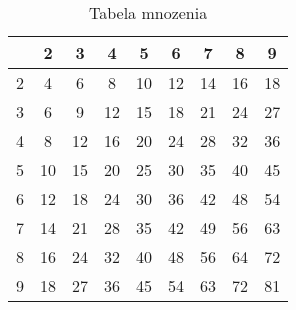 \begin{table}[htbp]
\centering
\begin{tabular}{|c||c|c|c|c|c|c|c|c|} \hline
  &  2  &  3  &  4  &  5  &  6  &  7  &  8  &  9  \\ \hline\hline
2 &  4  &  6  &  8  &  10 &  12 &  14 &  16 &  18 \\ \hline
3 &  6  &  9  &  12 &  15 &  18 &  21 &  24 &  27 \\ \hline
4 &  8  &  12 &  16 &  20 &  24 &  28 &  32 &  36 \\ \hline
5 &  10 &  15 &  20 &  25 &  30 &  35 &  40 &  45 \\ \hline
6 &  12 &  18 &  24 &  30 &  36 &  42 &  48 &  54 \\ \hline
7 &  14 &  21 &  28 &  35 &  42 &  49 &  56 &  63 \\ \hline
8 &  16 &  24 &  32 &  40 &  48 &  56 &  64 &  72 \\ \hline
9 &  18 &  27 &  36 &  45 &  54 &  63 &  72 &  81 \\ \hline

            
\end{tabular}
\label{tab:mnozenie}
\caption{Tabela mnozenia}
\end{table}
